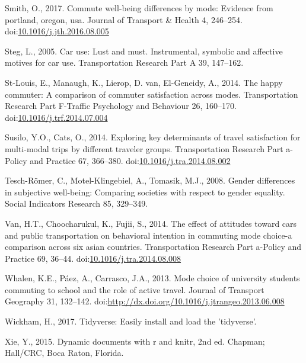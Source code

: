 \documentclass[]{elsarticle} %
\begin{document}
\leavevmode\hypertarget{ref-Smith2017commute}{}%
Smith, O., 2017. Commute well-being differences by mode: Evidence from
portland, oregon, usa. Journal of Transport \& Health 4, 246--254.
doi:\href{https://doi.org/10.1016/j.jth.2016.08.005}{10.1016/j.jth.2016.08.005}

\leavevmode\hypertarget{ref-Steg2005car}{}%
Steg, L., 2005. Car use: Lust and must. Instrumental, symbolic and
affective motives for car use. Transportation Research Part A 39,
147--162.

\leavevmode\hypertarget{ref-Stlouis2014happy}{}%
St-Louis, E., Manaugh, K., Lierop, D. van, El-Geneidy, A., 2014. The
happy commuter: A comparison of commuter satisfaction across modes.
Transportation Research Part F-Traffic Psychology and Behaviour 26,
160--170.
doi:\href{https://doi.org/10.1016/j.trf.2014.07.004}{10.1016/j.trf.2014.07.004}

\leavevmode\hypertarget{ref-Susilo2014exploring}{}%
Susilo, Y.O., Cats, O., 2014. Exploring key determinants of travel
satisfaction for multi-modal trips by different traveler groups.
Transportation Research Part a-Policy and Practice 67, 366--380.
doi:\href{https://doi.org/10.1016/j.tra.2014.08.002}{10.1016/j.tra.2014.08.002}

\leavevmode\hypertarget{ref-Tesch2008gender}{}%
Tesch-Römer, C., Motel-Klingebiel, A., Tomasik, M.J., 2008. Gender
differences in subjective well-being: Comparing societies with respect
to gender equality. Social Indicators Research 85, 329--349.

\leavevmode\hypertarget{ref-Van2014effect}{}%
Van, H.T., Choocharukul, K., Fujii, S., 2014. The effect of attitudes
toward cars and public transportation on behavioral intention in
commuting mode choice-a comparison across six asian countries.
Transportation Research Part a-Policy and Practice 69, 36--44.
doi:\href{https://doi.org/10.1016/j.tra.2014.08.008}{10.1016/j.tra.2014.08.008}

\leavevmode\hypertarget{ref-Whalen2013mode}{}%
Whalen, K.E., Páez, A., Carrasco, J.A., 2013. Mode choice of university
students commuting to school and the role of active travel. Journal of
Transport Geography 31, 132--142.
doi:\href{https://doi.org/http://dx.doi.org/10.1016/j.jtrangeo.2013.06.008}{http://dx.doi.org/10.1016/j.jtrangeo.2013.06.008}

\leavevmode\hypertarget{ref-Wickham2017}{}%
Wickham, H., 2017. Tidyverse: Easily install and load the 'tidyverse'.

\leavevmode\hypertarget{ref-Xie2015}{}%
Xie, Y., 2015. Dynamic documents with r and knitr, 2nd ed. Chapman;
Hall/CRC, Boca Raton, Florida.
\end{document}
